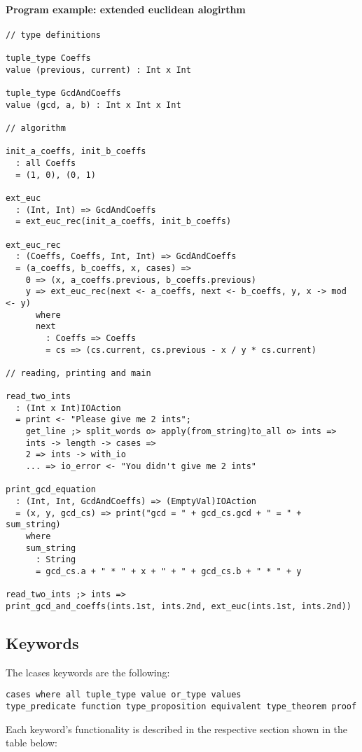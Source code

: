 \documentclass{article}
\begin{document}
\paragraph{Program example: extended euclidean alogirthm}
\begin{verbatim}
// type definitions

tuple_type Coeffs
value (previous, current) : Int x Int

tuple_type GcdAndCoeffs
value (gcd, a, b) : Int x Int x Int

// algorithm

init_a_coeffs, init_b_coeffs
  : all Coeffs
  = (1, 0), (0, 1)

ext_euc
  : (Int, Int) => GcdAndCoeffs
  = ext_euc_rec(init_a_coeffs, init_b_coeffs)

ext_euc_rec
  : (Coeffs, Coeffs, Int, Int) => GcdAndCoeffs
  = (a_coeffs, b_coeffs, x, cases) =>
    0 => (x, a_coeffs.previous, b_coeffs.previous)
    y => ext_euc_rec(next <- a_coeffs, next <- b_coeffs, y, x -> mod <- y)
      where
      next
        : Coeffs => Coeffs
        = cs => (cs.current, cs.previous - x / y * cs.current)

// reading, printing and main

read_two_ints
  : (Int x Int)IOAction
  = print <- "Please give me 2 ints";
    get_line ;> split_words o> apply(from_string)to_all o> ints =>
    ints -> length -> cases =>
    2 => ints -> with_io
    ... => io_error <- "You didn't give me 2 ints"
 
print_gcd_equation
  : (Int, Int, GcdAndCoeffs) => (EmptyVal)IOAction
  = (x, y, gcd_cs) => print("gcd = " + gcd_cs.gcd + " = " + sum_string)
    where
    sum_string
      : String
      = gcd_cs.a + " * " + x + " + " + gcd_cs.b + " * " + y

read_two_ints ;> ints =>
print_gcd_and_coeffs(ints.1st, ints.2nd, ext_euc(ints.1st, ints.2nd))
\end{verbatim}

\subsection{Keywords}

The lcases keywords are the following:
\begin{verbatim}
cases where all tuple_type value or_type values
type_predicate function type_proposition equivalent type_theorem proof
\end{verbatim}
Each keyword's functionality is described in the respective section shown in the 
table below:
\end{document}
